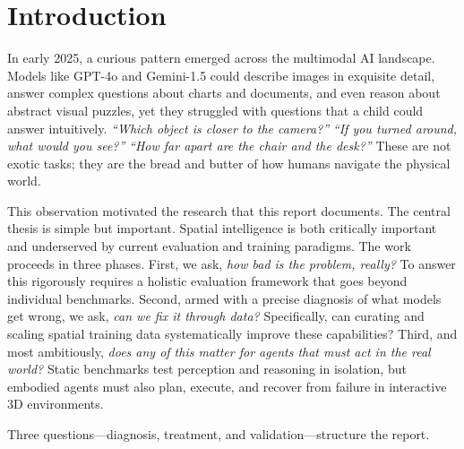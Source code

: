 \chapter{Introduction}
\label{sec:introduction}

In early 2025, a curious pattern emerged across the multimodal AI landscape. Models like GPT-4o and Gemini-1.5 could describe images in exquisite detail, answer complex questions about charts and documents, and even reason about abstract visual puzzles, yet they struggled with questions that a child could answer intuitively. \textit{``Which object is closer to the camera?''} \textit{``If you turned around, what would you see?''} \textit{``How far apart are the chair and the desk?''} These are not exotic tasks; they are the bread and butter of how humans navigate the physical world.

This observation motivated the research that this report documents. The central thesis is simple but important. Spatial intelligence is both critically important and underserved by current evaluation and training paradigms. The work proceeds in three phases. First, we ask, \textit{how bad is the problem, really?} To answer this rigorously requires a holistic evaluation framework that goes beyond individual benchmarks. Second, armed with a precise diagnosis of what models get wrong, we ask, \textit{can we fix it through data?} Specifically, can curating and scaling spatial training data systematically improve these capabilities? Third, and most ambitiously, \textit{does any of this matter for agents that must act in the real world?} Static benchmarks test perception and reasoning in isolation, but embodied agents must also plan, execute, and recover from failure in interactive 3D environments.

Three questions---diagnosis, treatment, and validation---structure the report.
